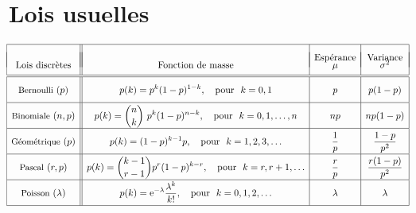 \documentclass[12pt,french]{article}
\begin{document}
\newpage


\section*{Lois usuelles}
\vspace{0.2 cm}
\begin{displaymath}
\hspace*{-0.1cm}
{\renewcommand{\arraystretch}{2}
\begin{array}{|c||c|c|c|}
\hline
 & & \mbox{Esp\'erance} & \mbox{Variance}\\[-16pt]
\mbox{Lois discr\`etes}& \mbox{Fonction de masse}& \mu & \sigma^2 \\
\hline
\hline
\mbox{\small Bernoulli}~(p) & \displaystyle
p(k)=p^k(1-p)^{1-k},~~~\mbox{pour}~~k=0,1 &
\displaystyle p & \displaystyle p(1-p) \\[.10cm]
\hline
\mbox{\small Binomiale}~(n,p)& \displaystyle
p(k)={n \choose k}~p^{k}(1-p)^{n-k},~~~\mbox{pour}~~k=0,1,\ldots,n&
\displaystyle np& \displaystyle np(1-p)\\[.10cm]
\hline
\mbox{\small G\'eom\'etrique}~(p)&\displaystyle
p(k)=(1-p)^{k-1}p,~~~\mbox{pour}~~k=1,2,3,\ldots& \displaystyle
\frac{1}{p}& \displaystyle \frac{1-p}{p^{2}}\\[.10cm]
\hline
\mbox{\small Pascal}~(r,p)&\displaystyle
p(k)={k-1 \choose r-1}p^r(1-p)^{k-r},~~~\mbox{pour}~~k=r,r+1,\ldots& \displaystyle
\frac{r}{p}& \displaystyle \frac{r(1-p)}{p^{2}}\\[.10cm]
\hline
\mbox{\small Poisson}~(\lambda)&\displaystyle
p(k)=\mbox{e}^{-\lambda}\frac{\lambda^k}{k!},~~~\mbox{pour}~~k=0,1,2,\ldots& \displaystyle
\lambda & \displaystyle \lambda \\[.10cm]
\hline
\multicolumn{4}{c}{}  \\[-0.8 cm]
%
%


\end{array}}
\end{displaymath}
\end{document}
